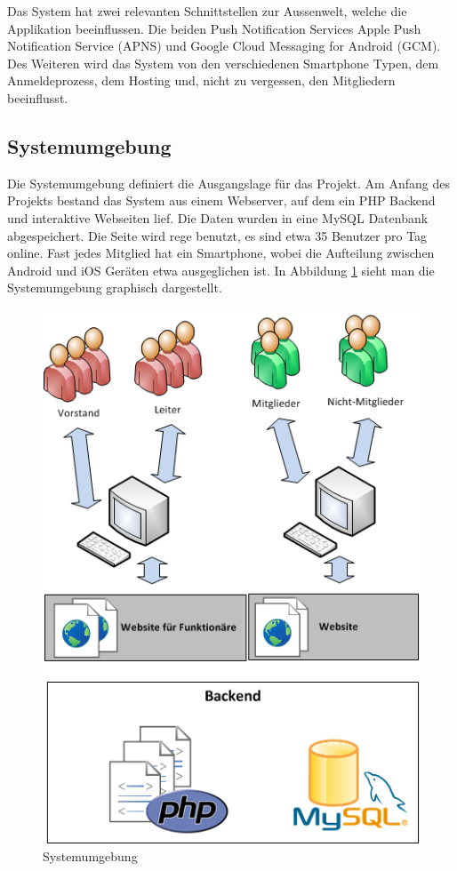 Das System hat zwei relevanten Schnittstellen zur Aussenwelt, welche die Applikation beeinflussen. Die beiden Push Notification Services Apple Push Notification Service (APNS) und Google Cloud Messaging for Android (GCM). Des Weiteren wird das System von den verschiedenen Smartphone Typen, dem Anmeldeprozess, dem Hosting und, nicht zu vergessen, den Mitgliedern beeinflusst.

\subsection{Systemumgebung}\label{systemumgebung}
Die Systemumgebung definiert die Ausgangslage für das Projekt. Am Anfang des Projekts bestand das System aus einem Webserver, auf dem ein PHP Backend und interaktive Webseiten lief. Die Daten wurden in eine MySQL Datenbank abgespeichert. Die Seite wird rege benutzt, es sind etwa 35 Benutzer pro Tag online. Fast jedes Mitglied hat ein Smartphone, wobei die Aufteilung zwischen Android und iOS Geräten etwa ausgeglichen ist. In Abbildung \ref{fig:systemumgebung} sieht man die Systemumgebung graphisch dargestellt.
\begin{figure}[h]
\centering
\includegraphics[scale=0.8]{images/visio/systemumgebung.png}
\caption{Systemumgebung}
\label{fig:systemumgebung}
\end{figure}

